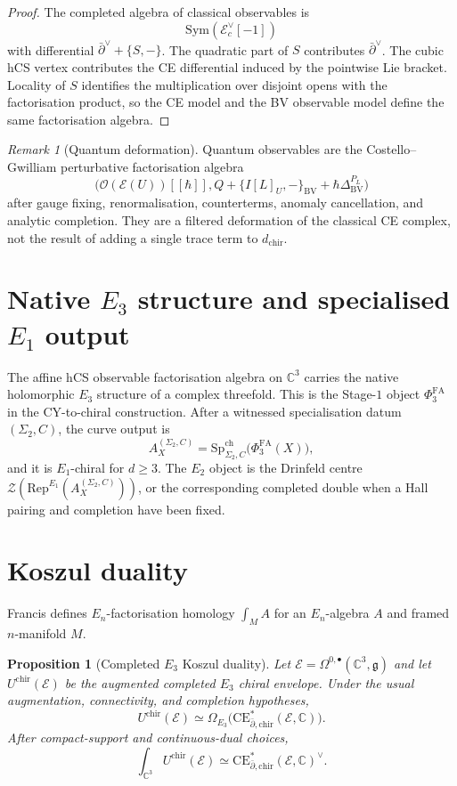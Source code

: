 \documentclass[11pt]{amsart}
\providecommand{\C}{\mathbb{C}}
\providecommand{\dbar}{\bar{\partial}}
\providecommand{\g}{\mathfrak{g}}
\providecommand{\BV}{\mathrm{BV}}
\providecommand{\Sym}{\mathrm{Sym}}
\providecommand{\CE}{\mathrm{CE}}
\providecommand{\chir}{\mathrm{chir}}
\providecommand{\Rep}{\mathrm{Rep}}
\providecommand{\cE}{\mathcal{E}}
\providecommand{\cO}{\mathcal{O}}
\providecommand{\cZ}{\mathcal{Z}}
\providecommand{\PhiFA}{\Phi^{\mathrm{FA}}}
\providecommand{\SpCh}{\mathrm{Sp}^{\mathrm{ch}}}
\theoremstyle{plain}
\newtheorem{proposition}[theorem]{Proposition}
\theoremstyle{definition}
\theoremstyle{remark}
\newtheorem{remark}[theorem]{Remark}
\begin{document}
\begin{proof}
The completed algebra of classical observables is
\[
  \Sym(\cE_c^\vee[-1])
\]
with differential $\dbar^\vee+\{S,-\}$. The quadratic part of $S$
contributes $\dbar^\vee$. The cubic hCS vertex contributes the CE
differential induced by the pointwise Lie bracket. Locality of $S$
identifies the multiplication over disjoint opens with the factorisation
product, so the CE model and the BV observable model define the same
factorisation algebra.
\end{proof}

\begin{remark}[Quantum deformation]
Quantum observables are the Costello--Gwilliam perturbative
factorisation algebra
\[
  \bigl(\cO(\cE(U))[[\hbar]],
  Q+\{I[L]_U,-\}_{\BV}+\hbar\Delta^{P_L}_{\BV}\bigr)
\]
after gauge fixing, renormalisation, counterterms, anomaly cancellation,
and analytic completion. They are a filtered deformation of the
classical CE complex, not the result of adding a single trace term to
$d_{\chir}$.
\end{remark}

\section{Native $E_3$ structure and specialised $E_1$ output}
The affine hCS observable factorisation algebra on $\C^3$ carries the
native holomorphic $E_3$ structure of a complex threefold. This is the
Stage-$1$ object $\PhiFA_3$ in the CY-to-chiral construction. After a
witnessed specialisation datum $(\Sigma_2,C)$, the curve output is
\[
  A_X^{(\Sigma_2,C)}
  =
  \SpCh_{\Sigma_2,C}\bigl(\PhiFA_3(X)\bigr),
\]
and it is $E_1$-chiral for $d\geq3$. The $E_2$ object is the Drinfeld
centre $\cZ(\Rep^{E_1}(A_X^{(\Sigma_2,C)}))$, or the corresponding
completed double when a Hall pairing and completion have been fixed.

\section{Koszul duality}
Francis \cite[\S3]{Francis13} defines $E_n$-factorisation homology
$\int_M A$ for an $E_n$-algebra $A$ and framed $n$-manifold $M$.

\begin{proposition}[Completed $E_3$ Koszul duality]
\label{prop:koszul-factorisation}
Let $\cE=\Omega^{0,\bullet}(\C^3,\g)$ and let
$U^{\chir}(\cE)$ be the augmented completed $E_3$ chiral envelope.
Under the usual augmentation, connectivity, and completion hypotheses,
\[
  U^{\chir}(\cE)
  \simeq
  \Omega_{E_3}\!\bigl(\CE^*_{\dbar,\chir}(\cE,\C)\bigr).
\]
After compact-support and continuous-dual choices,
\[
  \int_{\C^3}U^{\chir}(\cE)
  \simeq
  \CE^*_{\dbar,\chir}(\cE,\C)^\vee .
\]
\end{proposition}
\end{document}

